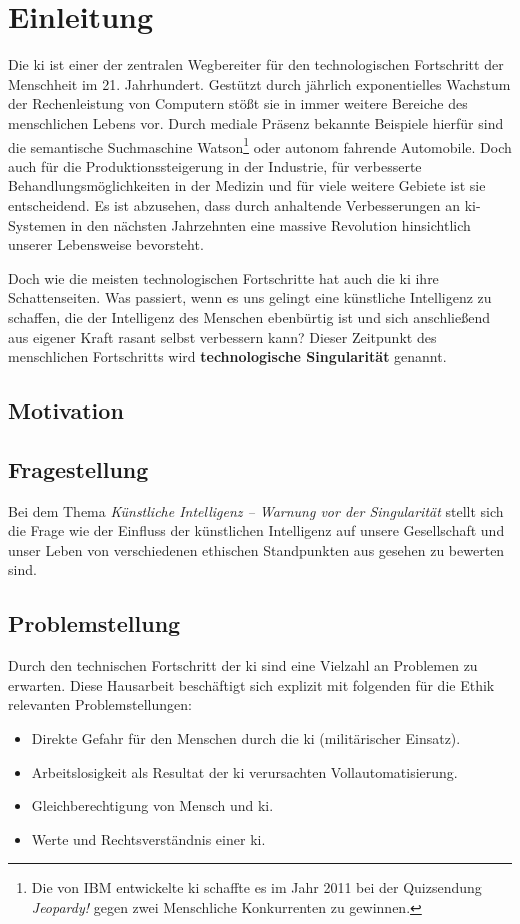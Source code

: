 \section{Einleitung}
Die \ac{ki} ist einer der zentralen Wegbereiter für den technologischen Fortschritt der Menschheit im 21. Jahrhundert.
Gestützt durch jährlich exponentielles Wachstum der Rechenleistung von Computern stößt sie in immer weitere Bereiche des menschlichen Lebens vor.
Durch mediale Präsenz bekannte Beispiele hierfür sind die semantische Suchmaschine Watson\footnote{Die von IBM entwickelte \ac{ki} schaffte es im Jahr 2011 bei der Quizsendung \textit{Jeopardy!} gegen zwei Menschliche Konkurrenten zu gewinnen.} oder autonom fahrende Automobile. %
Doch auch für die Produktionssteigerung in der Industrie, für verbesserte Behandlungsmöglichkeiten in der Medizin und für viele weitere Gebiete ist sie entscheidend.
Es ist abzusehen, dass durch anhaltende Verbesserungen an \ac{ki}-Systemen in den nächsten Jahrzehnten eine massive Revolution hinsichtlich unserer Lebensweise bevorsteht.

Doch wie die meisten technologischen Fortschritte hat auch die \ac{ki} ihre Schattenseiten.
Was passiert, wenn es uns gelingt eine künstliche Intelligenz zu schaffen, die der Intelligenz des Menschen ebenbürtig ist und sich anschließend aus eigener Kraft rasant selbst verbessern kann?
Dieser Zeitpunkt des menschlichen Fortschritts wird \textbf{technologische Singularität} genannt.

\subsection{Motivation}




\subsection{Fragestellung}
Bei dem Thema \textit{Künstliche Intelligenz -- Warnung vor der Singularität} stellt sich die Frage wie der Einfluss der künstlichen Intelligenz auf unsere Gesellschaft und unser Leben von verschiedenen ethischen Standpunkten aus gesehen zu bewerten sind.


\subsection{Problemstellung}
Durch den technischen Fortschritt der \ac{ki} sind eine Vielzahl an Problemen zu erwarten.
Diese Hausarbeit beschäftigt sich explizit mit folgenden für die Ethik relevanten Problemstellungen: 
\begin{itemize} 
	\item Direkte Gefahr für den Menschen durch die \ac{ki} (militärischer Einsatz).
	\item Arbeitslosigkeit als Resultat der \ac{ki} verursachten Vollautomatisierung.   
	\item Gleichberechtigung von Mensch und \ac{ki}.
	\item Werte und Rechtsverständnis einer \ac{ki}.
\end{itemize}
